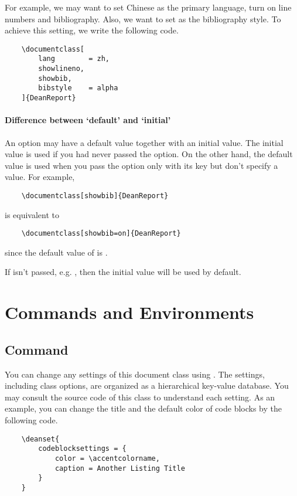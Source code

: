 \documentclass[showbib, lang=en]{DeanReport}
\begin{document}
For example, we may want to set Chinese as the primary language, turn on line numbers and bibliography. Also, we want to set  as the bibliography style. To achieve this setting, we write the following code.

\begin{codeblock}[title = An example of passing options]
\begin{verbatim}
    \documentclass[
        lang        = zh,
        showlineno,
        showbib,
        bibstyle    = alpha
    ]{DeanReport}
\end{verbatim}
\end{codeblock}

\paragraph{Difference between `default' and `initial'} An option may have a default value together with an initial value. The initial value is used if you had never passed the option. On the other hand, the default value is used when you pass the option only with its key but don't specify a value. For example,
\begin{codeblock*}
\begin{verbatim}
    \documentclass[showbib]{DeanReport}
\end{verbatim}
\end{codeblock*}
is equivalent to 
\begin{codeblock*}
\begin{verbatim}
    \documentclass[showbib=on]{DeanReport}
\end{verbatim}
\end{codeblock*}
since the default value of  is .
\par 
If  isn't passed, e.g. , then the initial value  will be used by default.


\section{Commands and Environments}
\subsection{Command \texorpdfstring{}{deanset} }

You can change any settings of this document class using . The settings, including class options, are organized as a hierarchical key-value database. You may consult the source code of this class to understand each setting. As an example, you can change the title and the default color of code blocks by the following code.
\begin{codeblock*}
\begin{verbatim}
    \deanset{
        codeblocksettings = {
            color = \accentcolorname,
            caption = Another Listing Title
        }
    }
\end{verbatim}
\end{codeblock*}
\end{document}
